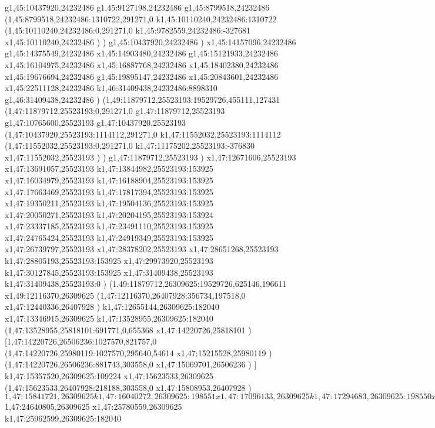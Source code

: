 {g1,45:10437920,24232486
g1,45:9127198,24232486
g1,45:8799518,24232486
(1,45:8799518,24232486:1310722,291271,0
k1,45:10110240,24232486:1310722
(1,45:10110240,24232486:0,291271,0
k1,45:9782559,24232486:-327681
x1,45:10110240,24232486
)
)
g1,45:10437920,24232486
)
x1,45:14157096,24232486
g1,45:14375549,24232486
x1,45:14903480,24232486
g1,45:15121933,24232486
x1,45:16104975,24232486
x1,45:16887768,24232486
x1,45:18402380,24232486
x1,45:19676694,24232486
g1,45:19895147,24232486
x1,45:20843601,24232486
x1,45:22511128,24232486
k1,46:31409438,24232486:8898310
g1,46:31409438,24232486
)
(1,49:11879712,25523193:19529726,455111,127431
(1,47:11879712,25523193:0,291271,0
g1,47:11879712,25523193
g1,47:10765600,25523193
g1,47:10437920,25523193
(1,47:10437920,25523193:1114112,291271,0
k1,47:11552032,25523193:1114112
(1,47:11552032,25523193:0,291271,0
k1,47:11175202,25523193:-376830
x1,47:11552032,25523193
)
)
g1,47:11879712,25523193
)
x1,47:12671606,25523193
x1,47:13691057,25523193
k1,47:13844982,25523193:153925
x1,47:16034979,25523193
k1,47:16188904,25523193:153925
x1,47:17663469,25523193
k1,47:17817394,25523193:153925
x1,47:19350211,25523193
k1,47:19504136,25523193:153925
x1,47:20050271,25523193
k1,47:20204195,25523193:153924
x1,47:23337185,25523193
k1,47:23491110,25523193:153925
x1,47:24765424,25523193
k1,47:24919349,25523193:153925
x1,47:26739797,25523193
x1,47:28378202,25523193
x1,47:28651268,25523193
k1,47:28805193,25523193:153925
x1,47:29973920,25523193
k1,47:30127845,25523193:153925
x1,47:31409438,25523193
k1,47:31409438,25523193:0
)
(1,49:11879712,26309625:19529726,625146,196611
x1,49:12116370,26309625
(1,47:12116370,26407928:356734,197518,0
x1,47:12440336,26407928
)
k1,47:12655144,26309625:182040
x1,47:13346915,26309625
k1,47:13528955,26309625:182040
(1,47:13528955,25818101:691771,0,655368
x1,47:14220726,25818101
)
[1,47:14220726,26506236:1027570,821757,0
(1,47:14220726,25980119:1027570,295640,54614
x1,47:15215528,25980119
)
(1,47:14220726,26506236:881743,303558,0
x1,47:15069701,26506236
)
]
k1,47:15357520,26309625:109224
x1,47:15623533,26309625
(1,47:15623533,26407928:218188,303558,0
x1,47:15808953,26407928
)
$1,47:15841721,26309625
k1,47:16040272,26309625:198551
x1,47:17096133,26309625
k1,47:17294683,26309625:198550
x1,47:17622364,26309625
k1,47:17820915,26309625:198551
x1,47:19095229,26309625
k1,47:19293779,26309625:198550
x1,47:20841161,26309625
k1,47:21039712,26309625:198551
x1,47:23388092,26309625
k1,47:23586642,26309625:198550
x1,47:24442254,26309625
k1,47:24640805,26309625:198551
$1,47:24640805,26309625
x1,47:25780559,26309625
k1,47:25962599,26309625:182040
}
